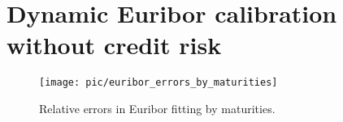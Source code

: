 \section{Dynamic Euribor calibration without credit risk}

\begin{figure}[H]
	\centering
	\texttt{[image: pic/euribor\_errors\_by\_maturities]}
	\caption{Relative errors in Euribor fitting by maturities.}
	\label{fig:euribor_errors_by_maturities}
\end{figure}

